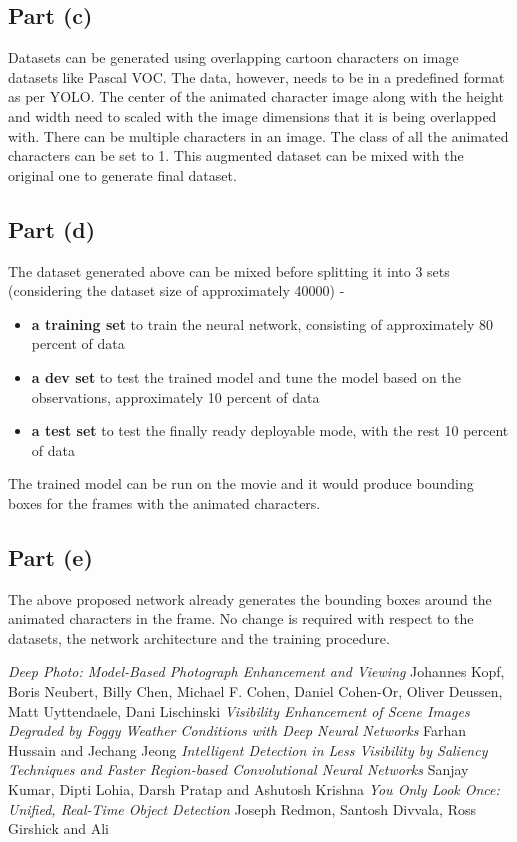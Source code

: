 \documentclass[twosided]{article}
\begin{document}
\subsection{Part (c)}
Datasets can be generated using overlapping cartoon characters on image datasets like Pascal VOC. The data, however, needs to be in a predefined format as per YOLO. The center of the animated character image along with the height and width need to scaled with the image dimensions that it is being overlapped with. There can be multiple characters in an image. The class of all the animated characters can be set to 1. This augmented dataset can be mixed with the original one to generate final dataset.

\subsection{Part (d)}
The dataset generated above can be mixed before splitting it into 3 sets (considering the dataset size of approximately 40000) -
\begin{itemize}
    \item \textbf{a training set} to train the neural network, consisting of approximately 80 percent of data
    \item \textbf{a dev set} to test the trained model and tune the model based on the observations, approximately 10 percent of data
    \item \textbf{a test set} to test the finally ready deployable mode, with the rest 10  percent of data 
\end{itemize}
The trained model can be run on the movie and it would produce bounding boxes for the frames with the animated characters.

\subsection{Part (e)}
The above proposed network already generates the bounding boxes around the animated characters in the frame. No change is required with respect to the datasets, the network architecture and the training procedure.

\begin{thebibliography}{99}
\textit{Deep Photo: Model-Based Photograph Enhancement and Viewing}
Johannes Kopf, Boris Neubert, Billy Chen, Michael F. Cohen, Daniel Cohen-Or, Oliver Deussen, Matt Uyttendaele, Dani Lischinski
\textit{Visibility Enhancement of Scene Images Degraded by Foggy Weather Conditions with Deep Neural Networks}
Farhan Hussain and Jechang Jeong
\textit{Intelligent Detection in Less Visibility by Saliency Techniques and Faster Region-based Convolutional Neural Networks}
Sanjay Kumar, Dipti Lohia, Darsh Pratap and Ashutosh Krishna
\textit{You Only Look Once: Unified, Real-Time Object Detection}
Joseph Redmon, Santosh Divvala, Ross Girshick and Ali
\end{thebibliography}
\end{document}
